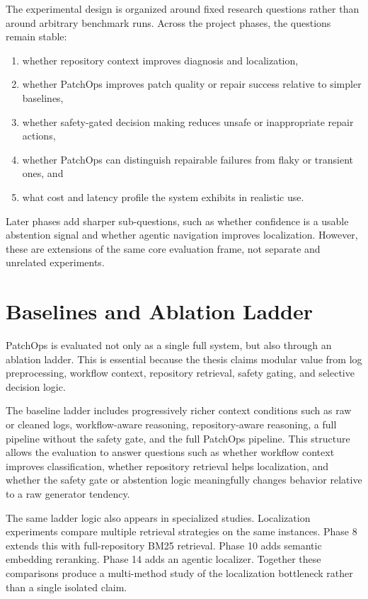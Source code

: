 The experimental design is organized around fixed research questions rather than around arbitrary benchmark runs.
Across the project phases, the questions remain stable:

\begin{enumerate}
\item whether repository context improves diagnosis and localization,
\item whether PatchOps improves patch quality or repair success relative to simpler baselines,
\item whether safety-gated decision making reduces unsafe or inappropriate repair actions,
\item whether PatchOps can distinguish repairable failures from flaky or transient ones, and
\item what cost and latency profile the system exhibits in realistic use.
\end{enumerate}

Later phases add sharper sub-questions, such as whether confidence is a usable abstention signal and whether
agentic navigation improves localization. However, these are extensions of the same core evaluation frame, not
separate and unrelated experiments.

\section{Baselines and Ablation Ladder}

PatchOps is evaluated not only as a single full system, but also through an ablation ladder. This is essential
because the thesis claims modular value from log preprocessing, workflow context, repository retrieval, safety
gating, and selective decision logic.

The baseline ladder includes progressively richer context conditions such as raw or cleaned logs, workflow-aware
reasoning, repository-aware reasoning, a full pipeline without the safety gate, and the full PatchOps pipeline.
This structure allows the evaluation to answer questions such as whether workflow context improves
classification, whether repository retrieval helps localization, and whether the safety gate or abstention logic
meaningfully changes behavior relative to a raw generator tendency.

The same ladder logic also appears in specialized studies. Localization experiments compare multiple retrieval
strategies on the same instances. Phase 8 extends this with full-repository BM25 retrieval. Phase 10 adds
semantic embedding reranking. Phase 14 adds an agentic localizer. Together these comparisons produce a
multi-method study of the localization bottleneck rather than a single isolated claim.

